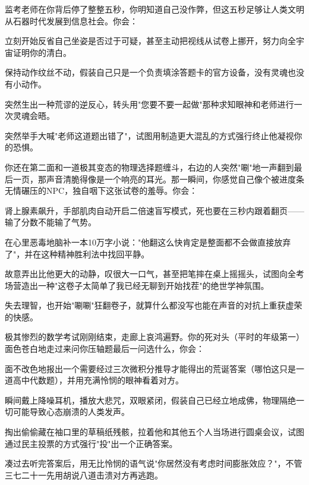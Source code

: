 \documentclass{exam-zh}
\begin{document}
\begin{question}[points = 5]
  监考老师在你背后停了整整五秒，你明知道自己没作弊，但这五秒足够让人类文明从石器时代发展到信息社会。你会：
  \begin{choices}
    \item 立刻开始反省自己坐姿是否过于可疑，甚至主动把视线从试卷上挪开，努力向全宇宙证明你的清白。
    \item 保持动作纹丝不动，假装自己只是一个负责填涂答题卡的官方设备，没有灵魂也没有小动作。
    \item 突然生出一种荒谬的逆反心，转头用"您要不要一起做"那种求知眼神和老师进行一次灵魂会晤。
    \item 突然举手大喊"老师这道题出错了"，试图用制造更大混乱的方式强行终止他凝视你的恐惧。
  \end{choices}
\end{question}

\begin{question}[points = 5]
  你还在第二面和一道极其变态的物理选择题缠斗，右边的人突然"唰"地一声翻到最后一页，那声音清脆得像是一个响亮的耳光。那一瞬间，你感觉自己像个被进度条无情碾压的NPC，独自咽下这张试卷的羞辱。你会：
  \begin{choices}
    \item 肾上腺素飙升，手部肌肉自动开启二倍速盲写模式，死也要在三秒内跟着翻页——输了分数不能输了气势。
    \item 在心里恶毒地脑补一本10万字小说："他翻这么快肯定是整面都不会做直接放弃了"，并在这种精神胜利法中找回平静。
    \item 故意弄出比他更大的动静，叹很大一口气，甚至把笔摔在桌上摇摇头，试图向全考场营造出一种"这卷子太简单了我已经无聊到开始找茬"的绝世学神氛围。
    \item 失去理智，也开始"唰唰"狂翻卷子，就算什么都没写也能在声音的对抗上重获虚荣的快感。
  \end{choices}
\end{question}

\begin{question}[points = 5]
  极其惨烈的数学考试刚刚结束，走廊上哀鸿遍野。你的死对头（平时的年级第一）面色苍白地走过来问你压轴题最后一问选什么，你会：
  \begin{choices}
    \item 面不改色地报出一个需要经过三次微积分推导才能得出的荒诞答案（哪怕这只是一道高中代数题），并用充满怜悯的眼神看着对方。
    \item 瞬间戴上降噪耳机，播放大悲咒，双眼紧闭，假装自己已经立地成佛，物理隔绝一切可能导致心态崩溃的人类发声。
    \item 掏出偷偷藏在袖口里的草稿纸残骸，拉着他和其他五个人当场进行圆桌会议，试图通过民主投票的方式强行"投"出一个正确答案。
    \item 凑过去听完答案后，用无比怜悯的语气说"你居然没有考虑时间膨胀效应？"，不管三七二十一先用胡说八道击溃对方再逃跑。
  \end{choices}
\end{question}
\end{document}
